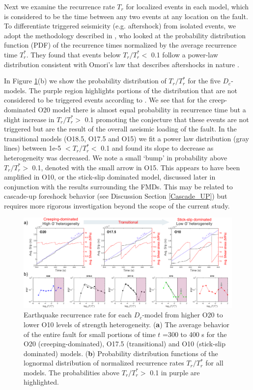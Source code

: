 \documentclass[preprint,1p, 10pt,authoryear]{elsarticle}
\begin{document}
Next we examine the recurrence rate $T_{r}$ for localized events in each model, which is considered to be the time between any two events at any location on the fault. To differentiate triggered  seismicity (e.g. aftershock) from isolated events, we adopt the methodology described in \citet{Lengline2009}, who looked at the probability distribution function (PDF) of the recurrence times normalized by the average recurrence time $T^{*}_{r}$.  They found that events below $T_{r}/T^{*}_{r} <$ 0.1 follow a power-law distribution consistent with Omori's law that describes aftershocks in nature \citep[e.g.,][]{Lengline2009}. 

In Figure \ref{fig11}(b) we show the probability distribution of $T_{r}/T^{*}_{r}$ for the five $D_{c}$-models. The purple region highlights portions of the distribution that are not considered to be triggered events according to \citet{Lengline2009}. We see that for the creep-dominated O20 model there is almost equal probability in recurrence time but a slight increase in  $T_{r}/T^{*}_{r} >$ 0.1 promoting the conjecture that these events are not triggered but are the result of the overall aseismic loading of the fault. In the transitional models (O18.5, O17.5 and O15) we fit a power law distribution (gray lines) between 1e-5 $< T_{r}/T^{*}_{r} <$ 0.1 and found its slope to decrease as heterogeneity was decreased. We note a small `bump' in probability above $T_{r}/T^{*}_{r} >$ 0.1, denoted with the small arrow in O15. This appears to have been amplified in O10, or the stick-slip dominated model, discussed later in conjunction with the results surrounding the FMDs.  This may be related to cascade-up foreshock behavior (see Discussion Section \ref{Cascade_UP}) but requires more rigorous investigation beyond the scope of the current study.

\begin{figure}
    	\centering
	\includegraphics[scale = 0.9]{FIG11_revised.pdf} 
	\caption{Earthquake recurrence rate for each $D_{c}$-model from higher O20 to lower O10 levels of strength heterogeneity. (\textbf{a}) The average behavior of the entire fault for small portions of time $t$ =300 to 400 s for the O20 (creeping-dominated), O17.5 (transitional) and O10 (stick-slip dominated) models. (\textbf{b}) Probability distribution functions of the lognormal distribution of normalized recurrence rates $T_{r}/T^{*}_{r}$ for all models. The probabilities above $T_{r}/T^{*}_{r} >$ 0.1 in purple are highlighted.}
	\label{fig11}
\end{figure}
\end{document}
